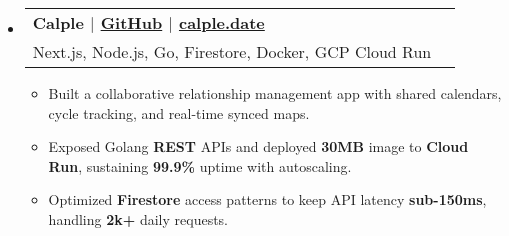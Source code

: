 \documentclass[letterpaper,11pt]{article}
\makeatletter
\newcommand{\resumeItem}[1]{
  \item{
    {#1}
  }
}
\newcommand{\resumeSubheading}[4]{
    \item
    \begin{tabular*}{0.985\textwidth}[t]{l@{\extracolsep{\fill}}r@{\hspace{-0.1in}}}
        {\textbf{#1}} & {#2} \\
        #3 &  #4 \\
    \end{tabular*}\vspace{-5pt}
}
\newcommand{\resumeSubHeadingListStart}{\begin{itemize}[leftmargin=0.00in, rightmargin=-0.2in, label={}]\vspace{3pt}}
\newcommand{\resumeSubHeadingListEnd}{\end{itemize}\vspace{-5pt}}
\newcommand{\resumeItemListStart}{\vspace{3pt}\begin{itemize}[leftmargin=0.15in, rightmargin=0.15in]}
\newcommand{\resumeItemListEnd}{\end{itemize}\vspace{-5pt}}
\makeatother
\begin{document}

\resumeSubHeadingListStart
\resumeSubheading
{\textbf{Calple} \textnormal{$|$ \href{https://github.com/juhun32/calple}{GitHub} $|$ \href{https://www.calple.date}{calple.date}}} {}
{{Next.js, Node.js, Go, Firestore, Docker, GCP Cloud Run}}{}
\resumeItemListStart
\resumeItem{Built a collaborative relationship management app with shared calendars, cycle tracking, and real-time synced maps.}
\resumeItem{Exposed Golang \textbf{REST} APIs and deployed \textbf{30MB} image to \textbf{Cloud Run}, sustaining \textbf{99.9\%} uptime with autoscaling.}
\resumeItem{Optimized \textbf{Firestore} access patterns to keep API latency \textbf{sub-150ms}, handling \textbf{2k+} daily requests.}
\resumeItemListEnd
\resumeSubHeadingListEnd

\end{document}
